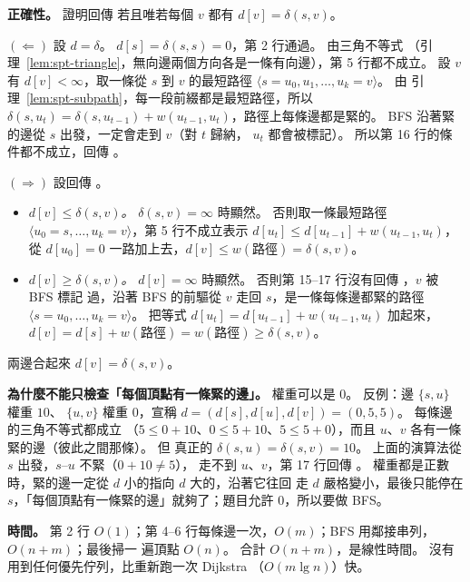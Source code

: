 \textbf{正確性。} 證明回傳 \TRUE 若且唯若每個 $v$ 都有 $d[v] = \delta(s, v)$。

$(\Leftarrow)$ 設 $d = \delta$。 $d[s] = \delta(s, s) = 0$，第 2 行通過。 由三角不等式
（引理~\ref{lem:spt-triangle}，無向邊兩個方向各是一條有向邊），第 5 行都不成立。 設 $v$ 有
$d[v] < \infty$，取一條從 $s$ 到 $v$ 的最短路徑 $\langle s = u_0, u_1, \ldots, u_k = v \rangle$。 由
引理~\ref{lem:spt-subpath}，每一段前綴都是最短路徑，所以 $\delta(s, u_t) = \delta(s, u_{t-1}) +
w(u_{t-1}, u_t)$，路徑上每條邊都是緊的。 BFS 沿著緊的邊從 $s$ 出發，一定會走到 $v$（對 $t$ 歸納，
$u_t$ 都會被標記）。 所以第 16 行的條件都不成立，回傳 \TRUE。

$(\Rightarrow)$ 設回傳 \TRUE。
\begin{itemize}
\item \emph{$d[v] \le \delta(s, v)$。} $\delta(s, v) = \infty$ 時顯然。 否則取一條最短路徑
$\langle u_0 = s, \ldots, u_k = v \rangle$，第 5 行不成立表示 $d[u_t] \le d[u_{t-1}] + w(u_{t-1}, u_t)$，
從 $d[u_0] = 0$ 一路加上去，$d[v] \le w(\text{路徑}) = \delta(s, v)$。
\item \emph{$d[v] \ge \delta(s, v)$。} $d[v] = \infty$ 時顯然。 否則第 15--17 行沒有回傳 \FALSE，$v$ 被 BFS 標記
過，沿著 BFS 的前驅從 $v$ 走回 $s$，是一條每條邊都緊的路徑 $\langle s = u_0, \ldots, u_k = v \rangle$。
把等式 $d[u_t] = d[u_{t-1}] + w(u_{t-1}, u_t)$ 加起來，$d[v] = d[s] + w(\text{路徑}) = w(\text{路徑})
\ge \delta(s, v)$。
\end{itemize}
兩邊合起來 $d[v] = \delta(s, v)$。

\textbf{為什麼不能只檢查「每個頂點有一條緊的邊」。} 權重可以是 $0$。 反例：邊 $\{s, u\}$ 權重 $10$、
$\{u, v\}$ 權重 $0$，宣稱 $d = (d[s], d[u], d[v]) = (0, 5, 5)$。 每條邊的三角不等式都成立
（$5 \le 0 + 10$、$0 \le 5 + 10$、$5 \le 5 + 0$），而且 $u$、$v$ 各有一條緊的邊（彼此之間那條）。 但
真正的 $\delta(s, u) = \delta(s, v) = 10$。 上面的演算法從 $s$ 出發，$s$--$u$ 不緊（$0 + 10 \ne 5$），
走不到 $u$、$v$，第 17 行回傳 \FALSE。 權重都是正數時，緊的邊一定從 $d$ 小的指向 $d$ 大的，沿著它往回
走 $d$ 嚴格變小，最後只能停在 $s$，「每個頂點有一條緊的邊」就夠了；題目允許 $0$，所以要做 BFS。

\textbf{時間。} 第 2 行 $O(1)$；第 4--6 行每條邊一次，$O(m)$；BFS 用鄰接串列，$O(n + m)$；最後掃一
遍頂點 $O(n)$。 合計 $O(n + m)$，是線性時間。 沒有用到任何優先佇列，比重新跑一次 Dijkstra
（$O(m \lg n)$）快。
